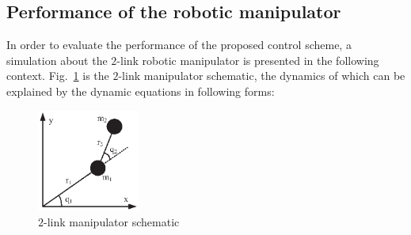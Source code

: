 \documentclass[3p]{elsarticle}
\theoremstyle{plain}
\theoremstyle{remark}
\begin{document}
\subsection{Performance of the robotic manipulator}\label{sec:robotica manipulator}
In order to evaluate the performance of the proposed control scheme, a simulation about the $2$-link robotic manipulator is presented in the following context. Fig.~\ref{Figure:1} is the $2$-link manipulator schematic, the dynamics of which can be explained by the dynamic equations in following forms:
\begin{figure}[http]
\centering
\includegraphics[width=0.3\textwidth]{paper3_fig1.eps}
\caption{$2$-link manipulator schematic}
\label{Figure:1}
\end{figure}
\end{document}
